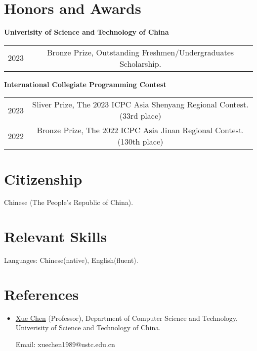 \documentclass[12pt,a4paper,oneside]{ctexart}
\begin{document}
\section*{Honors and Awards}

\textbf{Univerisity of Science and Technology of China}

\begin{tabular}{cc}
    2023 & Bronze Prize, Outstanding Freshmen/Undergraduates Scholarship.
\end{tabular}

\vspace{0.5cm}

\textbf{International Collegiate Programming Contest}

\begin{tabular}{cc}
    2023 & Sliver Prize, The 2023 ICPC Asia Shenyang Regional Contest. (33rd place) \\
    2022 & Bronze Prize, The 2022 ICPC Asia Jinan Regional Contest. (130th place)
\end{tabular}

\section*{Citizenship}

Chinese (The People's Republic of China).

\section*{Relevant Skills}

Languages: Chinese(native), English(fluent).

\section*{References}

\begin{itemize}
    \item \href{http://staff.ustc.edu.cn/~xuechen1989/}{Xue Chen} (Professor), Department of Computer Science and Technology, Univerisity of Science and Technology of China.
    
          Email: xuechen1989@ustc.edu.cn
\end{itemize}
\end{document}
